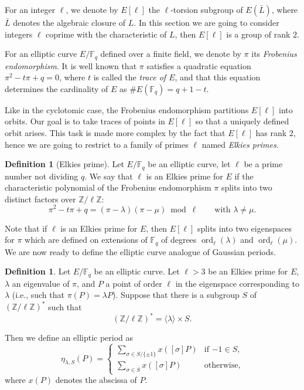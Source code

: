 \documentclass[12pt]{article}
\theoremstyle{plain}
\theoremstyle{definition}
\newtheorem{definition}[theorem]{Definition}
\DeclareMathOperator{\order}{ord} %
\def\Z{\ensuremath{\mathbb{Z}}}
\def\F{\ensuremath{\mathbb{F}}}
\begin{document}
For an integer $\ell$, we denote by $E[\ell]$ the $\ell$-torsion
subgroup of $E(\bar{L})$, where $\bar{L}$ denotes the algebraic
closure of $L$. In this section we are going to consider integers
$\ell$ coprime with the characteristic of $L$, then $E[\ell]$ is a
group of rank $2$.

For an elliptic curve $E/\F_q$ defined over a finite field, we denote
by $\pi$ its \emph{Frobenius endomorphism}. It is well known that
$\pi$ satisfies a quadratic equation $\pi^2-t\pi+q=0$, where $t$ is
called the \emph{trace of $E$}, and that this equation determines the
cardinality of $E$ as $\#E(\F_q)=q+1-t$.

Like in the cyclotomic case, the Frobenius endomorphism partitions
$E[\ell]$ into orbits. Our goal is to take traces of points in
$E[\ell]$ so that a uniquely defined orbit arises. This task is made
more complex by the fact that $E[\ell]$ has rank 2, hence we are going
to restrict to a family of primes $\ell$ named \emph{Elkies primes}.

\begin{definition}[Elkies prime]
  Let $E/\F_q$ be an elliptic curve, let $\ell$ be a prime number not
  dividing $q$.  We say that $\ell$ is an Elkies prime for $E$ if the
  characteristic polynomial of the Frobenius endomorphism $\pi$ splits
  into two distinct factors over $\Z/\ell\Z$:
\begin{equation}
\pi^2-t\pi+q=(\pi-\lambda)(\pi-\mu)\bmod\ell
\qquad\text{with $\lambda\ne\mu$}.
\end{equation}
\end{definition}

Note that if $\ell$ is an Elkies prime for $E$, then $E[\ell]$ splits
into two eigenspaces for $\pi$ which are defined on extensions of
$\F_q$ of degrees $\order_\ell(\lambda)$ and $\order_\ell(\mu)$. We
are now ready to define the elliptic curve analogue of Gaussian
periods.

\begin{definition}
  \label{definition:ellperiod}
  Let $E/\F_q$ be an elliptic curve.  Let $\ell > 3$ be an Elkies
  prime for $E$, $\lambda$ an eigenvalue of $\pi$, and $P$ a point of
  order $\ell$ in the eigenspace corresponding to $\lambda$ (i.e.,
  such that $\pi(P)=\lambda P$).  Suppose that there is a subgroup $S$
  of $(\Z/\ell\Z)^{\ast}$ such that
  \begin{equation}
    (\Z/\ell\Z)^{\ast} = \langle{\lambda}\rangle \times S.
  \end{equation}
  
  Then we define an elliptic period as
  \begin{equation}
    \eta_{\lambda,S}(P) =
    \begin{cases}
      \sum_{\sigma\in S/\{\pm1\}} {x \left([\sigma] P \right)} & \text{if $-1\in S$,}\\
      \sum_{\sigma\in S} {x \left([\sigma] P \right)} & \text{otherwise,}
    \end{cases}
  \end{equation}
  where $x(P)$ denotes the abscissa of $P$.
\end{definition}
\end{document}
